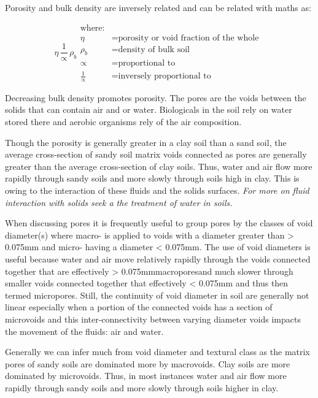 \documentclass{article}
\begin{document}
Porosity and bulk density are inversely related and can be related with maths as:

\begin{equation}
    \eta \, \frac{1}{\propto} \, \rho_b
    \begin{aligned}
        \text{where:}                                          \\
        \eta &= \text{porosity or void fraction of the whole } \\
        \rho_b &= \text{density of bulk soil}                  \\
        \propto &= \text{proportional to}                      \\
        \frac{1}{\propto} &= \text{inversely proportional to}
    \end{aligned}
\end{equation}

Decreasing bulk density promotes porosity. The pores are the voids between the solids that can contain air and or water. Biologicals in the soil rely on water stored there and aerobic organisms rely of the air composition.

Though the porosity is generally greater in a clay soil than a sand soil, the average cross-section of sandy soil matrix voids connected as pores are generally greater than the average cross-section of clay soils. Thus, water and air flow more rapidly through sandy soils and more slowly through soils high in clay. This is owing to the interaction of these fluids and the solids surfaces. \textit{For more on fluid interaction with solids seek a the treatment of water in soils.}

When discussing pores it is frequently useful to group pores by the classes of void diameter(s) where macro- is applied to voids with a diameter greater than \num{> 0.075}{mm} and micro- having a diameter \num{< 0.075}{mm}. The use of void diameters is useful because water and air move relatively rapidly through the voids connected together that are effectively \num{> 0.075}{mm}\textemdash{}macropores\textemdash{}and much slower through smaller voids connected together that effectively \num{< 0.075}{mm} and thus then termed  micropores. Still, the continuity of void diameter in soil are generally not linear especially when a portion of the connected voids has a section of microvoids and this inter-connectivity between varying diameter voids impacts the movement of the fluids: air and water.

Generally we can infer much from void diameter and textural class as the matrix pores of sandy soils are dominated more by macrovoids. Clay soils are more dominated by microvoids. Thus, in most instances water and air flow more rapidly through sandy soils and more slowly through soils higher in clay.
\end{document}
